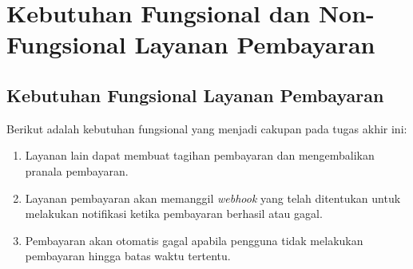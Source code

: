 \section{Kebutuhan Fungsional dan Non-Fungsional Layanan Pembayaran}

\subsection{Kebutuhan Fungsional Layanan Pembayaran}

Berikut adalah kebutuhan fungsional yang menjadi cakupan pada tugas akhir ini:

\begin{enumerate}
    \item Layanan lain dapat membuat tagihan pembayaran dan mengembalikan pranala pembayaran.
    \item Layanan pembayaran akan memanggil \textit{webhook} yang telah ditentukan untuk melakukan notifikasi ketika pembayaran berhasil atau gagal.
    \item Pembayaran akan otomatis gagal apabila pengguna tidak melakukan pembayaran hingga batas waktu tertentu.
\end{enumerate}